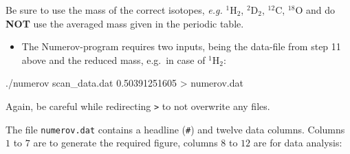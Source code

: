 \documentclass[
  letterpaper,
]{article}
\newenvironment{Shaded}{\begin{snugshade}}{\end{snugshade}}
\newcommand{\ExtensionTok}[1]{\textcolor[rgb]{0.00,0.23,0.31}{#1}}
\newcommand{\NormalTok}[1]{\textcolor[rgb]{0.00,0.23,0.31}{#1}}
\newcommand{\OperatorTok}[1]{\textcolor[rgb]{0.37,0.37,0.37}{#1}}
\providecommand{\tightlist}{%
  \setlength{\itemsep}{0pt}\setlength{\parskip}{0pt}}\usepackage{longtable,booktabs,array}
\begin{document}
\begin{tcolorbox}[enhanced jigsaw, toptitle=1mm, opacitybacktitle=0.6, colframe=quarto-callout-warning-color-frame, toprule=.15mm, breakable, bottomrule=.15mm, left=2mm, title=\textcolor{quarto-callout-warning-color}{\faExclamationTriangle}\hspace{0.5em}{Warning}, titlerule=0mm, leftrule=.75mm, bottomtitle=1mm, coltitle=black, arc=.35mm, rightrule=.15mm, opacityback=0, colback=white, colbacktitle=quarto-callout-warning-color!10!white]

Be sure to use the mass of the correct isotopes, \emph{e.g.}
\(\mathrm{^1H_2}\), \(\mathrm{^2D_2}\), \(\mathrm{^{12}C}\),
\(\mathrm{^{18}O}\) and do \textbf{NOT} use the averaged mass given in
the periodic table.

\end{tcolorbox}

\begin{itemize}
\tightlist
\item
  The Numerov-program requires two inputs, being the data-file from step
  11 above and the reduced mass, e.g.~in case of \(\mathrm{^1H_2}\):
\end{itemize}

\begin{Shaded}
\begin{Highlighting}[]
\ExtensionTok{./numerov}\NormalTok{ scan\_data.dat 0.50391251605 }\OperatorTok{\textgreater{}}\NormalTok{ numerov.dat}
\end{Highlighting}
\end{Shaded}

Again, be careful while redirecting \texttt{\textgreater{}} to not
overwrite any files.

The file \texttt{numerov.dat} contains a headline (\texttt{\#}) and
twelve data columns. Columns \(1\) to \(7\) are to generate the required
figure, columns \(8\) to \(12\) are for data analysis:
\end{document}

